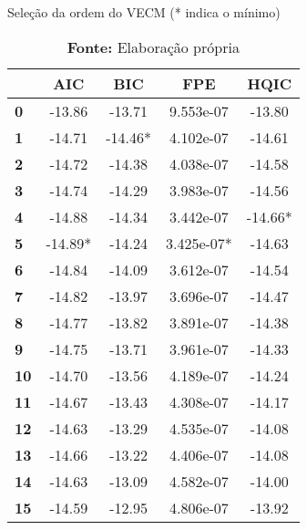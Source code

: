 \begin{table}
\caption{Seleção da ordem do VECM (* indica o mínimo)}
\label{criterios}
\begin{center}
\begin{tabular}{lcccc}
\toprule
            & \textbf{AIC} & \textbf{BIC} & \textbf{FPE} & \textbf{HQIC}  \\
\midrule
\textbf{0}  &      -13.86  &      -13.71  &   9.553e-07  &       -13.80   \\
\textbf{1}  &      -14.71  &     -14.46*  &   4.102e-07  &       -14.61   \\
\textbf{2}  &      -14.72  &      -14.38  &   4.038e-07  &       -14.58   \\
\textbf{3}  &      -14.74  &      -14.29  &   3.983e-07  &       -14.56   \\
\textbf{4}  &      -14.88  &      -14.34  &   3.442e-07  &      -14.66*   \\
\textbf{5}  &     -14.89*  &      -14.24  &  3.425e-07*  &       -14.63   \\
\textbf{6}  &      -14.84  &      -14.09  &   3.612e-07  &       -14.54   \\
\textbf{7}  &      -14.82  &      -13.97  &   3.696e-07  &       -14.47   \\
\textbf{8}  &      -14.77  &      -13.82  &   3.891e-07  &       -14.38   \\
\textbf{9}  &      -14.75  &      -13.71  &   3.961e-07  &       -14.33   \\
\textbf{10} &      -14.70  &      -13.56  &   4.189e-07  &       -14.24   \\
\textbf{11} &      -14.67  &      -13.43  &   4.308e-07  &       -14.17   \\
\textbf{12} &      -14.63  &      -13.29  &   4.535e-07  &       -14.08   \\
\textbf{13} &      -14.66  &      -13.22  &   4.406e-07  &       -14.08   \\
\textbf{14} &      -14.63  &      -13.09  &   4.582e-07  &       -14.00   \\
\textbf{15} &      -14.59  &      -12.95  &   4.806e-07  &       -13.92   \\
\bottomrule
\end{tabular}
\caption*{\textbf{Fonte:} Elaboração própria}
\end{center}
\end{table}